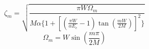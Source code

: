 \documentclass{article}
\begin{document}
\setcounter{equation}{96}
\begin{equation}
    \zeta_m = \sqrt{\frac{\pi W \Omega_m}{M\alpha\{1+[(\frac{\pi W}{\alpha E_c } - 1)\tan{(\frac{m W}{2 M})}]^2\}}}
\end{equation}
\begin{equation}
    \Omega_m = W \sin (\frac{m \pi}{2 M})
\end{equation}
\end{document}
